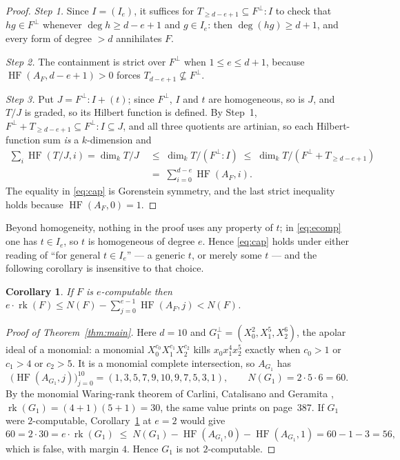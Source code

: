 \documentclass[11pt]{amsart}
\newtheorem{corollary}[theorem]{Corollary}
\theoremstyle{remark}
\theoremstyle{definition}
\DeclareMathOperator{\rk}{rk}
\DeclareMathOperator{\HF}{HF}
\newcommand{\perpp}{^{\perp}}
\begin{document}
\begin{proof}
\emph{Step 1.} Since $I=(I_e)$, it suffices for $T_{\ge d-e+1}\subseteq F\perpp:I$ to check that
$hg\in F\perpp$ whenever $\deg h\ge d-e+1$ and $g\in I_e$: then $\deg(hg)\ge d+1$, and every form
of degree $>d$ annihilates $F$.

\emph{Step 2.} The containment is strict over $F\perpp$ when $1\le e\le d+1$, because
$\HF(A_F,d-e+1)>0$ forces $T_{d-e+1}\not\subseteq F\perpp$.

\emph{Step 3.} Put $J=F\perpp:I+(t)$; since $F\perpp$, $I$ and $t$ are homogeneous, so is $J$,
and $T/J$ is graded, so its Hilbert function is defined. By Step~1,
$F\perpp+T_{\ge d-e+1}\subseteq F\perpp:I\subseteq J$, and all three quotients are artinian, so
each Hilbert-function sum \emph{is} a $k$-dimension and
\[
\begin{aligned}
 \sum_i\HF(T/J,i)=\dim_kT/J
 &\;\le\;\dim_kT/(F\perpp:I)
 \;\le\;\dim_kT/(F\perpp+T_{\ge d-e+1})\\
 &\;=\;\sum_{i=0}^{d-e}\HF(A_F,i).
\end{aligned}
\]
The equality in \eqref{eq:cap} is Gorenstein symmetry, and the last strict inequality holds
because $\HF(A_F,0)=1$.
\end{proof}

Beyond homogeneity, nothing in the proof uses any property of $t$; in \eqref{eq:ecomp} one has
$t\in I_e$, so $t$ is homogeneous of degree $e$. Hence \eqref{eq:cap} holds under either reading
of ``for general $t\in I_e$'' --- a generic $t$, or merely some $t$ --- and the following
corollary is insensitive to that choice.

\begin{corollary}\label{cor:bound}
If $F$ is $e$-computable then
$e\cdot\rk(F)\le N(F)-\sum_{j=0}^{e-1}\HF(A_F,j)<N(F)$.
\end{corollary}

\begin{proof}[Proof of Theorem~\ref{thm:main}]
Here $d=10$ and $G_1\perpp=(X_0^2,X_1^5,X_2^6)$, the apolar ideal of a monomial: a monomial
$X_0^{c_0}X_1^{c_1}X_2^{c_2}$ kills $x_0x_1^4x_2^5$ exactly when $c_0>1$ or $c_1>4$ or $c_2>5$.
It is a monomial complete intersection, so $A_{G_1}$ has
\[
 \bigl(\HF(A_{G_1},j)\bigr)_{j=0}^{10}=(1,3,5,7,9,10,9,7,5,3,1),
 \qquad
 N(G_1)=2\cdot5\cdot6=60 .
\]
By the monomial Waring-rank theorem of Carlini, Catalisano and Geramita \cite{CCG},
$\rk(G_1)=(4+1)(5+1)=30$, the same value \cite{CCCGW} prints on page~387. If $G_1$ were
$2$-computable, Corollary~\ref{cor:bound} at $e=2$ would give
\[
 60=2\cdot30=e\cdot\rk(G_1)\;\le\;N(G_1)-\HF(A_{G_1},0)-\HF(A_{G_1},1)=60-1-3=56,
\]
which is false, with margin $4$. Hence $G_1$ is not $2$-computable.
\end{proof}
\end{document}
